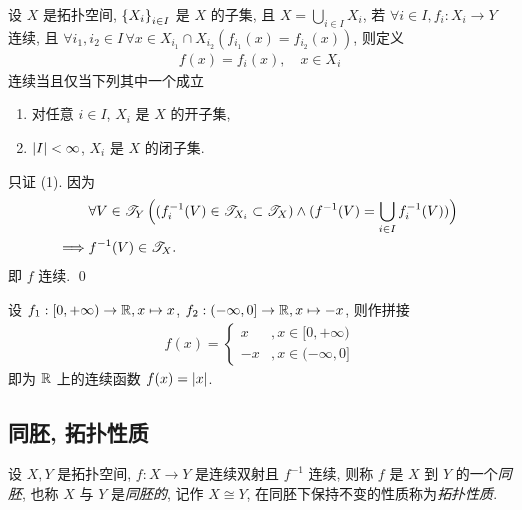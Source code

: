     \begin{Theorem}[拼接定理]
        设 $ X $ 是拓扑空间, $ \left\{ X_{i} \right\}_{i\in I} $ 是 $ X $ 的子集, 且 $ X=\bigcup_{i\in I}X_{i} $, 若 $ \forall i\in I, f_{i}:X_{i}\to Y $ 连续, 且 $ \forall i_{1}, i_{2}\in I\, \forall x\in X_{i_{1}}\cap X_{i_{2}}(f_{i_{1}}(x)=f_{i_{2}}(x)) $, 则定义
        \begin{align*}
            f(x)=f_{i}(x), \quad x\in X_{i}
        \end{align*}
        连续当且仅当下列其中一个成立
        \begin{enumerate}
            \item 对任意 $ i\in I $, $ X_{i} $ 是 $ X $ 的开子集,
            \item $ \left| I \right| <\infty $, $ X_{i} $ 是 $ X $ 的闭子集.
        \end{enumerate}
    \end{Theorem}
    \begin{Proof}
        只证 (1). 因为
        \begin{align*}
            & \forall V\in\mathscr{T}_{Y}\,\Big((f_{i}^{-1}(V)\in\mathscr{T}_{X_{i}}\subset\mathscr{T}_{X})\land (f^{-1}(V)=\bigcup_{i\in I}f_{i}^{-1}(V))\Big)\\
            \Longrightarrow{} & f^{-1}(V)\in\mathscr{T}_{X}.
        \end{align*}
        即 $ f $ 连续. \qed
    \end{Proof}

    \begin{Example}
        设 $ f_{1}: [0, +\infty)\to \mathbb{R}, x\mapsto x $, $ f_{2}:(-\infty, 0]\to \mathbb{R}, x\mapsto -x $, 则作拼接
        \begin{align*}
            f(x)=\begin{cases}
                x & ,x\in[0, +\infty)\\
                -x & , x\in(-\infty, 0]
            \end{cases}
        \end{align*}
        即为 $ \mathbb{R} $ 上的连续函数 $ f(x)=\left| x \right|  $.
    \end{Example}

\subsection{同胚, 拓扑性质}
    \begin{Definition}[同胚]
        设 $ X, Y $ 是拓扑空间, $ f: X\to Y $ 是连续双射且 $ f^{-1} $ 连续, 则称 $ f $ 是 $ X $ 到 $ Y $ 的一个\emph{同胚}, 也称 $ X $ 与 $ Y $ 是\emph{同胚的}, 记作 $ X\cong Y $, 在同胚下保持不变的性质称为\emph{拓扑性质}.
    \end{Definition}

